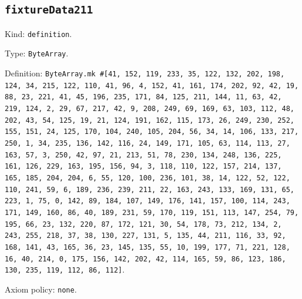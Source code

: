 \documentclass[11pt]{article}
\begin{document}
\subsection*{\texttt{fixtureData211}}
\noindent Kind: \texttt{definition}.\par
\noindent Type: \texttt{ByteArray}.\par
\noindent Definition: \texttt{ByteArray.mk \#[41, 152, 119, 233, 35, 122, 132, 202, 198, 124, 34, 215, 122, 110, 41, 96, 4, 152, 41, 161, 174, 202, 92, 42, 19, 88, 23, 221, 41, 45, 196, 235, 171, 84, 125, 211, 144, 11, 63, 42, 219, 124, 2, 29, 67, 217, 42, 9, 208, 249, 69, 169, 63, 103, 112, 48, 202, 43, 54, 125, 19, 21, 124, 191, 162, 115, 173, 26, 249, 230, 252, 155, 151, 24, 125, 170, 104, 240, 105, 204, 56, 34, 14, 106, 133, 217, 250, 1, 34, 235, 136, 142, 116, 24, 149, 171, 105, 63, 114, 113, 27, 163, 57, 3, 250, 42, 97, 21, 213, 51, 78, 230, 134, 248, 136, 225, 161, 126, 229, 163, 195, 156, 94, 3, 118, 110, 122, 157, 214, 137, 165, 185, 204, 204, 6, 55, 120, 100, 236, 101, 38, 14, 122, 52, 122, 110, 241, 59, 6, 189, 236, 239, 211, 22, 163, 243, 133, 169, 131, 65, 223, 1, 75, 0, 142, 89, 184, 107, 149, 176, 141, 157, 100, 114, 243, 171, 149, 160, 86, 40, 189, 231, 59, 170, 119, 151, 113, 147, 254, 79, 195, 66, 23, 132, 220, 87, 172, 121, 30, 54, 178, 73, 212, 134, 2, 243, 255, 218, 37, 38, 130, 227, 131, 5, 135, 44, 211, 116, 33, 92, 168, 141, 43, 165, 36, 23, 145, 135, 55, 10, 199, 177, 71, 221, 128, 16, 40, 214, 0, 175, 156, 142, 202, 42, 114, 165, 59, 86, 123, 186, 130, 235, 119, 112, 86, 112]}.\par
\noindent Axiom policy: \texttt{none}.\par
\end{document}
